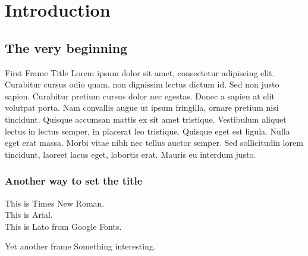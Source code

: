 \section{Introduction}
\subsection{The very beginning}

\begin{frame}{First Frame Title}
    Lorem ipsum dolor sit amet, consectetur adipiscing elit. Curabitur cursus odio quam, non dignissim lectus dictum id. Sed non justo sapien. Curabitur pretium cursus dolor nec egestas. Donec a sapien at elit volutpat porta. Nam convallis augue ut ipsum fringilla, ornare pretium nisi tincidunt. Quisque accumsan mattis ex sit amet tristique. Vestibulum aliquet lectus in lectus semper, in placerat leo tristique. Quisque eget est ligula. Nulla eget erat massa. Morbi vitae nibh nec tellus auctor semper. Sed sollicitudin lorem tincidunt, laoreet lacus eget, lobortis erat. Mauris eu interdum justo.
\end{frame}

\begin{frame}
    \frametitle{Another way to set the title}
    { This is Times New Roman.}\\
    { This is Arial.}\\
    { This is Lato from Google Fonts.}\\
\end{frame}

\begin{frame}{Yet another frame}
    Something interesting.
\end{frame}
